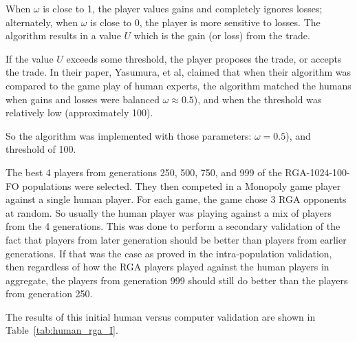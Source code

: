 When \(\omega\) is close to 1, the player values gains and completely ignores
losses; alternately, when \(\omega\) is close to 0, the player is more sensitive
to losses. The algorithm results in a value \(U\) which is the gain (or loss)
from the trade.

If the value \(U\) exceeds some threshold, the player proposes the trade, or
accepts the trade. In their paper, Yasumura, et al, claimed that when their
algorithm was compared to the game play of human experts, the algorithm matched
the humans when gains and losses were balanced \(\omega \approx 0.5\)), and when
the threshold was relatively low (approximately 100).

So the algorithm was implemented with those parameters: \(\omega = 0.5\)), and
threshold of 100.

The best 4 players from generations 250, 500, 750, and 999 of the
RGA-1024-100-FO populations were selected. They then competed in a Monopoly game
player against a single human player. For each game, the game chose 3 RGA
opponents at random. So usually the human player was playing against a mix of
players from the 4 generations. This was done to perform a secondary validation
of the fact that players from later generation should be better than players
from earlier generations. If that was the case as proved in the intra-population
validation, then regardless of how the RGA players played against the human
players in aggregate, the players from generation 999 should still do better
than the players from generation 250.

The results of this initial human versus computer validation are shown in
Table~\ref{tab:human_rga_I}.

